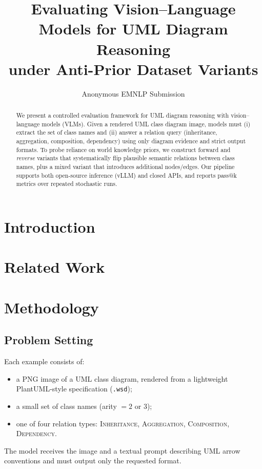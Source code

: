 \documentclass[11pt]{article}
\title{Evaluating Vision--Language Models for UML Diagram Reasoning\\under Anti-Prior Dataset Variants}
\author{Anonymous EMNLP Submission}
\begin{document}
\maketitle

\begin{abstract}
We present a controlled evaluation framework for UML diagram reasoning with vision--language models (VLMs).
Given a rendered UML class diagram image, models must (i) extract the set of class names and (ii) answer a relation query (inheritance, aggregation, composition, dependency) using only diagram evidence and strict output formats.
To probe reliance on world knowledge priors, we construct forward and \emph{reverse} variants that systematically flip plausible semantic relations between class names, plus a mixed variant that introduces additional nodes/edges.
Our pipeline supports both open-source inference (vLLM) and closed APIs, and reports pass@k metrics over repeated stochastic runs.
\end{abstract}

\section{Introduction}
\label{sec:intro}

\section{Related Work}
\label{sec:related}

\section{Methodology}
\label{sec:method}

\subsection{Problem Setting}
\label{sec:setting}
Each example consists of:
\begin{itemize}[leftmargin=*, itemsep=0.25em]
  \item a PNG image of a UML class diagram, rendered from a lightweight PlantUML-style specification (\texttt{.wsd});
  \item a small set of class names (arity $=2$ or $3$);
  \item one of four relation types: \textsc{Inheritance}, \textsc{Aggregation}, \textsc{Composition}, \textsc{Dependency}.
\end{itemize}
The model receives the image and a textual prompt describing UML arrow conventions and must output only the requested format.
\end{document}
